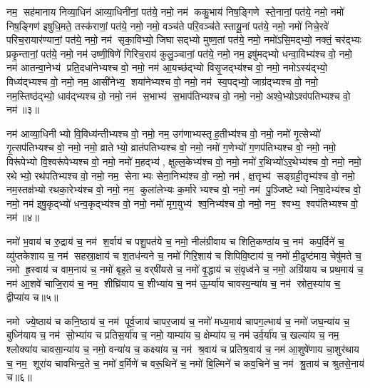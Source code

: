 नम॒ सह॑मानाय निव्या॒धिन॑ आव्या॒धिनी॑नां॒ पत॑ये॒ नमो॒ नम॑ ककु॒भाय॑ निष॒ङ्गिणे स्ते॒नानां॒ पत॑ये॒ नमो॒ नमो॑ निष॒ङ्गिण॑ इषुधि॒मते॒ तस्क॑राणां॒ पत॑ये॒ नमो॒ नमो॒ वञ्च॑ते परि॒वञ्च॑ते स्तायू॒नां पत॑ये॒ नमो॒ नमो॑ निचे॒रवे॑ परिच॒रायार॑ण्यानां॒ पत॑ये॒ नमो॒ नम॑ सृका॒विभ्यो॒ जिघासद्भ्यो मुष्ण॒तां पत॑ये॒ नमो॒ नमो॑ऽसि॒मद्भ्यो॒ नक्तं॒ चर॑द्भ्यः प्रकृ॒न्तानां॒ पत॑ये॒ नमो॒ नम॑ उष्णी॒षिणे॑ गिरिच॒राय॑ कुलु॒ञ्चानां॒ पत॑ये॒ नमो॒ नम॒ इषु॑मद्भ्यो धन्वा॒विभ्य॑श्च वो॒ नमो॒ नम॑ आतन्वा॒नेभ्य॑ प्रति॒दधा॑नेभ्यश्च वो॒ नमो॒ नम॑ आ॒यच्छ॑द्भ्यो विसृ॒जद्भ्य॑श्च वो॒ नमो॒ नमोऽस्य॑द्भ्यो॒ विध्य॑द्भ्यश्च वो॒ नमो॒ नम॒ आसी॑नेभ्य॒ शया॑नेभ्यश्च वो॒ नमो॒ नम॑ स्व॒पद्भ्यो॒ जाग्र॑द्भ्यश्च वो॒ नमो॒ नम॒स्तिष्ठ॑द्भ्यो॒ धाव॑द्भ्यश्च वो॒ नमो॒ नम॑ स॒भाभ्य॑ स॒भाप॑तिभ्यश्च वो॒ नमो॒ नमो॒ अश्वे॒भ्योऽश्व॑पतिभ्यश्च वो॒ नम॑॥३॥ 

नम॑ आव्या॒धिनीभ्यो वि॒विध्य॑न्तीभ्यश्च वो॒ नमो॒ नम॒ उग॑णाभ्यस्तृ\-ह॒तीभ्य॑श्च वो॒ नमो॒ नमो॑ गृ॒त्सेभ्यो॑ गृ॒त्सप॑तिभ्यश्च वो॒ नमो॒ नमो॒ व्रातेभ्यो॒ व्रात॑पतिभ्यश्च वो॒ नमो॒ नमो॑ ग॒णेभ्यो॑ ग॒णप॑तिभ्यश्च वो॒ नमो॒ नमो॒ विरू॑पेभ्यो वि॒श्वरू॑पेभ्यश्च वो॒ नमो॒ नमो॑ म॒हद्भ्य॑, क्षुल्ल॒केभ्य॑श्च वो॒ नमो॒ नमो॑ र॒थिभ्यो॑ऽर॒थेभ्य॑श्च वो॒ नमो॒ नमो॒ रथेभ्यो॒ रथ॑पतिभ्यश्च वो॒ नमो॒ नम॒ सेनाभ्यः सेना॒निभ्य॑श्च वो॒ नमो॒ नम॑, क्ष॒त्तृभ्य॑ सङ्ग्रही॒तृभ्य॑श्च वो॒ नमो॒ नम॒स्तक्ष॑भ्यो रथका॒रेभ्य॑श्च वो॒ नमो॒ नम॒ कुला॑लेभ्यः क॒र्मारेभ्यश्च वो॒ नमो॒ नम॑ पु॒ञ्जिष्टेभ्यो निषा॒देभ्य॑श्च वो॒ नमो॒ नम॑ इषु॒कृद्भ्यो॑ धन्व॒कृद्भ्य॑श्च वो॒ नमो॒ नमो॑ मृग॒युभ्य॑ श्व॒निभ्य॑श्च वो॒ नमो॒ नम॒ श्वभ्य॒ श्वप॑तिभ्यश्च वो॒ नम॑॥४॥ 

नमो॑ भ॒वाय॑ च रु॒द्राय॑ च॒ नम॑ श॒र्वाय॑ च पशु॒पत॑ये च॒ नमो॒ नील॑ग्रीवाय च शिति॒कण्ठा॑य च॒ नम॑ कप॒र्दिने॑ च॒ व्यु॑प्तकेशाय च॒ नम॑ सहस्रा॒क्षाय॑ च श॒तध॑न्वने च॒ नमो॑ गिरि॒शाय॑ च शिपिवि॒ष्टाय॑ च॒ नमो॑ मी॒ढुष्ट॑माय॒ चेषु॑मते च॒ नमो ह्र॒स्वाय॑ च वाम॒नाय॑ च॒ नमो॑ बृह॒ते च॒ वर्‌षी॑यसे च॒ नमो॑ वृ॒द्धाय॑ च सं॒वृध्व॑ने च॒ नमो॒ अग्रि॑याय च प्रथ॒माय॑ च॒ नम॑ आ॒शवे॑ चाजि॒राय॑ च॒ नम॒ शीघ्रि॑याय च॒ शीभ्या॑य च॒ नम॑ ऊ॒र्म्या॑य चावस्व॒न्या॑य च॒ नम॑ स्रोत॒स्या॑य च॒ द्वीप्या॑य च॥५॥ 

नमो ज्ये॒ष्ठाय॑ च कनि॒ष्ठाय॑ च॒ नम॑ पूर्व॒जाय॑ चापर॒जाय॑ च॒ नमो॑ मध्य॒माय॑ चापग॒ल्भाय॑ च॒ नमो॑ जघ॒न्या॑य च॒ बुध्नि॑याय च॒ नम॑ सो॒भ्या॑य च प्रतिस॒र्या॑य च॒ नमो॒ याम्या॑य च॒ क्षेम्या॑य च॒ नम॑ उर्व॒र्या॑य च॒ खल्या॑य च॒ नम॒ श्लोक्या॑य चावसा॒न्या॑य च॒ नमो॒ वन्या॑य च॒ कक्ष्या॑य च॒ नम॑ श्र॒वाय॑ च प्रतिश्र॒वाय॑ च॒ नम॑ आ॒शुषे॑णाय चा॒शुर॑थाय च॒ नम॒ शूरा॑य चावभिन्द॒ते च॒ नमो॑ व॒र्मिणे॑ च वरू॒थिने॑ च॒ नमो॑ बि॒ल्मिने॑ च कव॒चिने॑ च॒ नम॑ श्रु॒ताय॑ च श्रुतसे॒नाय॑ च॥६॥ 

